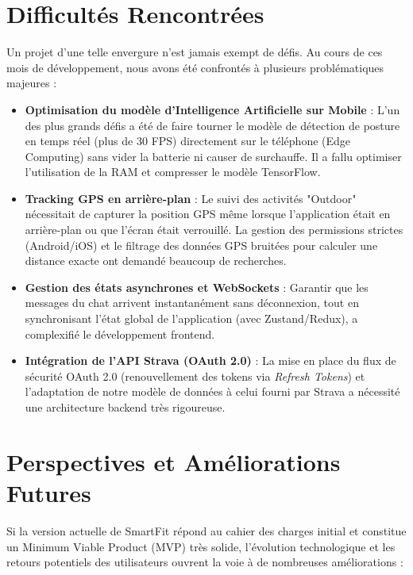 \section{Difficultés Rencontrées}
Un projet d'une telle envergure n'est jamais exempt de défis. Au cours de ces mois de développement, nous avons été confrontés à plusieurs problématiques majeures :

\begin{itemize}
    \item \textbf{Optimisation du modèle d'Intelligence Artificielle sur Mobile} : L'un des plus grands défis a été de faire tourner le modèle de détection de posture en temps réel (plus de 30 FPS) directement sur le téléphone (Edge Computing) sans vider la batterie ni causer de surchauffe. Il a fallu optimiser l'utilisation de la RAM et compresser le modèle TensorFlow.
    \item \textbf{Tracking GPS en arrière-plan} : Le suivi des activités "Outdoor" nécessitait de capturer la position GPS même lorsque l'application était en arrière-plan ou que l'écran était verrouillé. La gestion des permissions strictes (Android/iOS) et le filtrage des données GPS bruitées pour calculer une distance exacte ont demandé beaucoup de recherches.
    \item \textbf{Gestion des états asynchrones et WebSockets} : Garantir que les messages du chat arrivent instantanément sans déconnexion, tout en synchronisant l'état global de l'application (avec Zustand/Redux), a complexifié le développement frontend.
    \item \textbf{Intégration de l'API Strava (OAuth 2.0)} : La mise en place du flux de sécurité OAuth 2.0 (renouvellement des tokens via \textit{Refresh Tokens}) et l'adaptation de notre modèle de données à celui fourni par Strava a nécessité une architecture backend très rigoureuse.
\end{itemize}

\section{Perspectives et Améliorations Futures}
Si la version actuelle de SmartFit répond au cahier des charges initial et constitue un Minimum Viable Product (MVP) très solide, l'évolution technologique et les retours potentiels des utilisateurs ouvrent la voie à de nombreuses améliorations :

